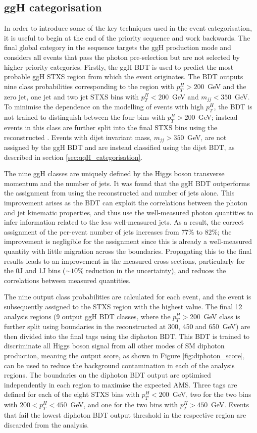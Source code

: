 \FloatBarrier
\newpage
\subsection{ggH categorisation}
In order to introduce some of the key techniques used in the event categorisation, it is useful to begin at the end of the priority sequence and work backwards. The final global category in the sequence targets the ggH production mode and considers all events that pass the photon pre-selection but are not selected by higher priority categories. Firstly, the ggH BDT is used to predict the most probable ggH STXS region from which the event originates. The BDT outputs nine class probabilities corresponding to the region with $p_T^H>200$~GeV and the zero jet, one jet and two jet STXS bins with $p_T^H<200$~GeV and $m_{jj}<350$~GeV. To minimise the dependence on the modelling of events with high $p_T^H$, the BDT is not trained to distinguish between the four bins with $p_T^H>200$~GeV; instead events in this class are further split into the final STXS bins using the reconstructed \ptgg. Events with dijet invariant mass, $m_{jj}>350$~GeV, are not assigned by the ggH BDT and are instead classified using the dijet BDT, as described in section \ref{sec:qqH_categorisation}.

The nine ggH classes are uniquely defined by the Higgs boson transverse momentum and the number of jets. It was found that the ggH BDT outperforms the assignment from using the reconstructed \ptgg and number of jets alone. This improvement arises as the BDT can exploit the correlations between the photon and jet kinematic properties, and thus use the well-measured photon quantities to infer information related to the less well-measured jets. As a result, the correct assignment of the per-event number of jets increases from 77\% to 82\%; the improvement is negligible for the \ptgg assignment since this is already a well-measured quantity with little migration across the \ptH boundaries. Propagating this to the final results leads to an improvement in the measured cross sections, particularly for the 0J and 1J bins ($\sim 10\%$ reduction in the uncertainty), and reduces the correlations between measured quantities.

The nine output class probabilities are calculated for each event, and the event is subsequently assigned to the STXS region with the highest value. The final 12 analysis regions (9 output ggH BDT classes, where the $p_T^H>200$~GeV class is further split using boundaries in the reconstructed \ptgg at 300, 450 and 650~GeV) are then divided into the final tags using the diphoton BDT. This BDT is trained to discriminate all Higgs boson signal from all other modes of SM diphoton production, meaning the output score, as shown in Figure \ref{fig:diphoton_score}, can be used to reduce the background contamination in each of the analysis regions. The boundaries on the diphoton BDT output are optimised independently in each region to maximise the expected AMS. Three tags are defined for each of the eight STXS bins with $p_T^H<200$~GeV, two for the two bins with $200<p_T^H<450$~GeV, and one for the two bins with $p_T^H>450$~GeV. Events that fail the lowest diphoton BDT output threshold in the respective region are discarded from the analysis. 

